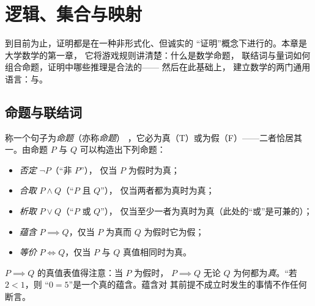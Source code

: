 \chapter{逻辑、集合与映射}\label{ch:b1:logic}

到目前为止，证明都是在一种非形式化、但诚实的
“证明”概念下进行的。本章是大学数学的第一章，
它将游戏规则讲清楚：什么是数学命题，
联结词与量词如何组合命题，证明中哪些推理是合法的——
然后在此基础上，
建立数学的两门通用语言：与。

\section{命题与联结词}

\begin{definition}[命题与联结词]\label{def:b1:logic:statement}
称一个句子为\emph{命题}（亦称\emph{命题}）
，它必为真（T）或为假（F）——二者恰居其一。由命题 $P$ 与
$Q$ 可以构造出下列命题：
\begin{itemize}
  \item \emph{否定} $\lnot P$（“非 $P$”），
        仅当 $P$ 为假时为真；
  \item \emph{合取} $P \land Q$（“$P$ 且 $Q$”），
        仅当两者都为真时为真；
  \item \emph{析取} $P \lor Q$（“$P$ 或 $Q$”），
        仅当至少一者为真时为真（此处的“或”是可兼的）；
  \item \emph{蕴含} $P \implies Q$，仅当 $P$
        为真而 $Q$ 为假时它为假；
  \item \emph{等价} $P \iff Q$，仅当 $P$
        与 $Q$ 真值相同时为真。
\end{itemize}
\end{definition}

\begin{remark}
$P \implies Q$ 的真值表值得注意：当 $P$ 为假时，
$P \implies Q$ 无论 $Q$ 为何都为\emph{真}。“若 $2 < 1$，则
“$0 = 5$”是一个真的蕴含。蕴含对
其前提不成立时发生的事情不作任何断言。
\end{remark}

